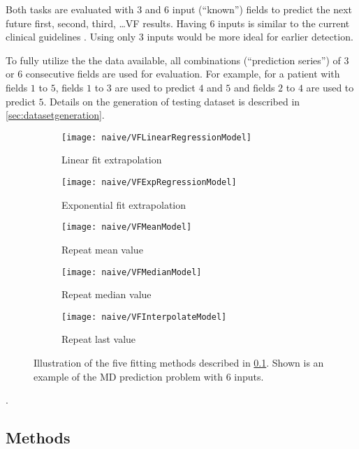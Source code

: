 Both tasks are evaluated with $3$ and $6$ input (``known'') fields to predict the next future first, second, third, \ldots \acl{VF} results. Having $6$ inputs is similar to the current clinical guidelines \cite{Chauhan2008}. Using only $3$ inputs would be more ideal for earlier detection. 

To fully utilize the the data available, all combinations (``prediction series'') of $3$ or $6$ consecutive fields are used for evaluation. For example, for a patient with fields $1$ to $5$, fields $1$ to $3$ are used to predict $4$ and $5$ and fields $2$ to $4$ are used to predict $5$. Details on the generation of testing dataset is described in \cref{sec:datasetgeneration}.

\begin{figure}[p]
	\centering
	\begin{subfigure}[b]{0.49\textwidth}
		\centering
		\texttt{[image: naive/VFLinearRegressionModel]}
		\caption{Linear fit extrapolation}
	\end{subfigure}
	\hfill
	\begin{subfigure}[b]{0.49\textwidth}
		\centering
		\texttt{[image: naive/VFExpRegressionModel]}
		\caption{Exponential fit extrapolation}
	\end{subfigure}
	\hfill
	\begin{subfigure}[b]{0.49\textwidth}
		\centering
		\texttt{[image: naive/VFMeanModel]}
		\caption{Repeat mean value}
	\end{subfigure}
	\hfill
	\begin{subfigure}[b]{0.49\textwidth}
		\centering
		\texttt{[image: naive/VFMedianModel]}
		\caption{Repeat median value}
	\end{subfigure}
	\hfill
	\begin{subfigure}[b]{0.49\textwidth}
		\centering
		\texttt{[image: naive/VFInterpolateModel]}
		\caption{Repeat last value}
	\end{subfigure}
	\caption[Illustration of the five fitting methods]{Illustration of the five fitting methods described in \cref{naivemethods}. Shown is an example of the \ac{MD} prediction problem with 6 inputs.}
\end{figure}. 


\subsection{Methods} \label{naivemethods}

